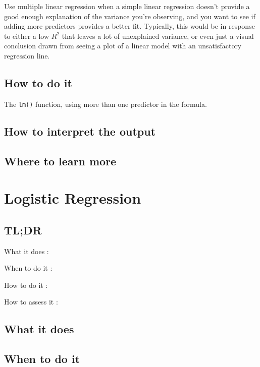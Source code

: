 \documentclass[
]{book}
\begin{document}
Use multiple linear regression when a simple linear regression doesn't provide a good enough explanation of the variance you're observing, and you want to see if adding more predictors provides a better fit. Typically, this would be in response to either a low \(R^2\) that leaves a lot of unexplained variance, or even just a visual conclusion drawn from seeing a plot of a linear model with an unsatisfactory regression line.

\hypertarget{how-to-do-it-1}{%
\section{How to do it}\label{how-to-do-it-1}}

The \texttt{lm()} function, using more than one predictor in the formula.

\hypertarget{how-to-interpret-the-output-1}{%
\section{How to interpret the output}\label{how-to-interpret-the-output-1}}

\hypertarget{where-to-learn-more-1}{%
\section{Where to learn more}\label{where-to-learn-more-1}}

\hypertarget{logistic-regression}{%
\chapter{Logistic Regression}\label{logistic-regression}}

\hypertarget{tldr-2}{%
\section{TL;DR}\label{tldr-2}}

What it does
:

When to do it
:

How to do it
:

How to assess it
:

\hypertarget{what-it-does-2}{%
\section{What it does}\label{what-it-does-2}}

\hypertarget{when-to-do-it-2}{%
\section{When to do it}\label{when-to-do-it-2}}
\end{document}
